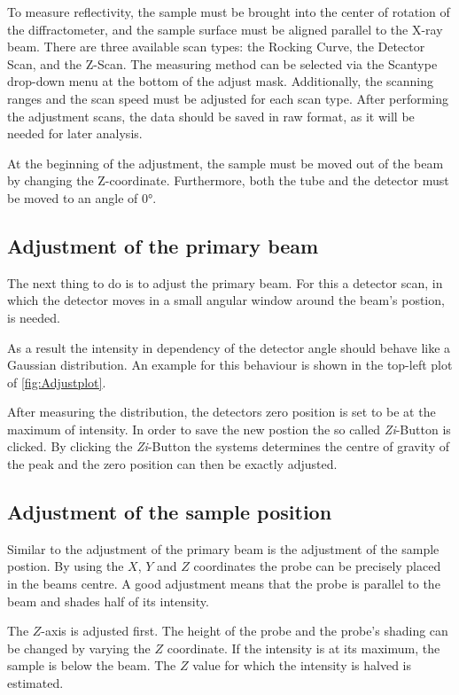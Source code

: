 To measure reflectivity, the sample must be brought into the center of rotation of the diffractometer, and the sample surface must be aligned parallel to the X-ray beam. There are three available scan types: the Rocking Curve, the Detector Scan, and the Z-Scan. The measuring method can be selected via the Scantype drop-down menu at the bottom of the adjust mask. Additionally, the scanning ranges and the scan speed must be adjusted for each scan type. After performing the adjustment scans, the data should be saved in raw format, as it will be needed for later analysis.

At the beginning of the adjustment, the sample must be moved out of the beam by changing the Z-coordinate. Furthermore, both the tube and the detector must be moved to an angle of 0°.

\subsection{Adjustment of the primary beam}
The next thing to do is to adjust the primary beam. For this a detector scan, in which the detector moves in a small angular window around the beam's postion, is needed. 

As a result the intensity in dependency of the detector angle should behave like a Gaussian distribution. An example for this behaviour is shown in the top-left plot of \autoref{fig:Adjustplot}.

After measuring the distribution, the detectors zero position is set to be at the maximum of intensity. In order to save the new postion the so called \textit{Zi}-Button is clicked. By clicking the \textit{Zi}-Button the systems determines the centre of gravity of the peak and the zero position can then be exactly adjusted.
 
\subsection{Adjustment of the sample position}
Similar to the adjustment of the primary beam is the adjustment of the sample postion. By using the $X$, $Y$ and $Z$ coordinates the probe can be precisely placed in the beams centre. A good adjustment means that the probe is parallel to the beam and shades half of its intensity. 

The $Z$-axis is adjusted first. The height of the probe and the probe's shading can be changed by varying the $Z$ coordinate. If the intensity is at its maximum, the sample is below the beam. The $Z$ value for which the intensity is halved is estimated.

